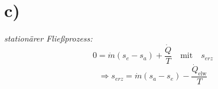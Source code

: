 

\section*{c)}
\textit{stationärer Fließprozess:}
\[
0 = \dot{m}(s_e - s_a) + \frac{\dot{Q}}{T} \quad \text{mit} \quad s_{erz}
\]
\[
\Rightarrow s_{erz} = \dot{m}(s_a - s_e) - \frac{\dot{Q}_{\text{elw}}}{T}
\]